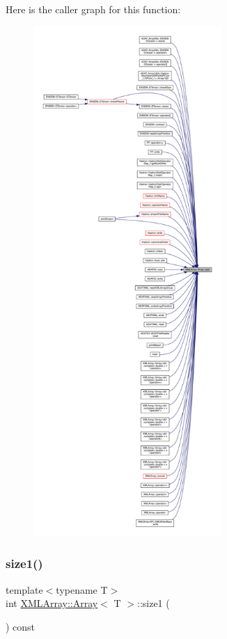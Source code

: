 Here is the caller graph for this function\+:
\nopagebreak
\begin{figure}[H]
\begin{center}
\leavevmode
\includegraphics[height=550pt]{db/d6c/classXMLArray_1_1Array_ab59904c2aa0e31c18c6cd5f5a186e292_icgraph}
\end{center}
\end{figure}
\mbox{\label{classXMLArray_1_1Array_a33e863988af56d045439d31058088c8c}} 
\subsubsection{\texorpdfstring{size1()}{size1()}\hspace{0.1cm}{\footnotesize\ttfamily [1/2]}}
{\footnotesize\ttfamily template$<$typename T$>$ \\
int \mbox{\hyperlink{classXMLArray_1_1Array}{X\+M\+L\+Array\+::\+Array}}$<$ T $>$\+::size1 (\begin{DoxyParamCaption}{ }\end{DoxyParamCaption}) const\hspace{0.3cm}{\ttfamily [inline]}}

